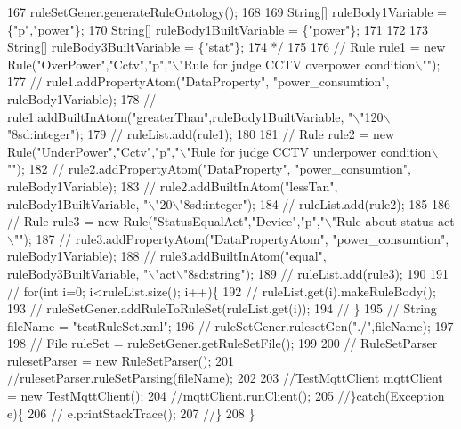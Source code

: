 \begin{DoxyCode}
167 \textcolor{comment}{              ruleSetGener.generateRuleOntology();}
168 \textcolor{comment}{              }
169 \textcolor{comment}{              String[] ruleBody1Variable = \{"p","power"\};}
170 \textcolor{comment}{              String[] ruleBody1BuiltVariable = \{"power"\};}
171 \textcolor{comment}{                  }
172 \textcolor{comment}{           }
173 \textcolor{comment}{              String[] ruleBody3BuiltVariable = \{"stat"\};}
174 \textcolor{comment}{          */}    
175              
176           \textcolor{comment}{//    Rule rule1 = new Rule("OverPower","Cctv","p","\(\backslash\)"Rule for judge CCTV overpower
       condition\(\backslash\)"");}
177            \textcolor{comment}{//   rule1.addPropertyAtom("DataProperty", "power\_consumtion", ruleBody1Variable);}
178            \textcolor{comment}{//   rule1.addBuiltInAtom("greaterThan",ruleBody1BuiltVariable, "\(\backslash\)"120\(\backslash\)"^^xsd:integer");        
       }
179            \textcolor{comment}{//   ruleList.add(rule1);}
180               
181              \textcolor{comment}{// Rule rule2 = new Rule("UnderPower","Cctv","p","\(\backslash\)"Rule for judge CCTV underpower
       condition\(\backslash\)"");}
182             \textcolor{comment}{//  rule2.addPropertyAtom("DataProperty", "power\_consumtion", ruleBody1Variable);}
183             \textcolor{comment}{//  rule2.addBuiltInAtom("lessTan", ruleBody1BuiltVariable, "\(\backslash\)"20\(\backslash\)"^^xsd:integer");}
184             \textcolor{comment}{//  ruleList.add(rule2);}
185               
186             \textcolor{comment}{//  Rule rule3 = new Rule("StatusEqualAct","Device","p","\(\backslash\)"Rule about status act \(\backslash\)"");}
187             \textcolor{comment}{//  rule3.addPropertyAtom("DataPropertyAtom", "power\_consumtion", ruleBody1Variable);}
188             \textcolor{comment}{//  rule3.addBuiltInAtom("equal", ruleBody3BuiltVariable, "\(\backslash\)"act\(\backslash\)"^^xsd:string");}
189             \textcolor{comment}{//  ruleList.add(rule3);}
190               
191            \textcolor{comment}{//   for(int i=0; i<ruleList.size(); i++)\{}
192             \textcolor{comment}{//    ruleList.get(i).makeRuleBody();}
193             \textcolor{comment}{//    ruleSetGener.addRuleToRuleSet(ruleList.get(i));}
194             \textcolor{comment}{//  \}}
195             \textcolor{comment}{// String fileName = "testRuleSet.xml";}
196             \textcolor{comment}{//  ruleSetGener.rulesetGen("./",fileName);}
197               
198              \textcolor{comment}{// File ruleSet = ruleSetGener.getRuleSetFile();}
199               
200             \textcolor{comment}{//  RuleSetParser rulesetParser = new RuleSetParser();}
201               \textcolor{comment}{//rulesetParser.ruleSetParsing(fileName);}
202               
203               \textcolor{comment}{//TestMqttClient mqttClient = new TestMqttClient();}
204               \textcolor{comment}{//mqttClient.runClient();}
205         \textcolor{comment}{//\}catch(Exception e)\{}
206         \textcolor{comment}{//  e.printStackTrace();}
207         \textcolor{comment}{//\}}
208     \}
\end{DoxyCode}


